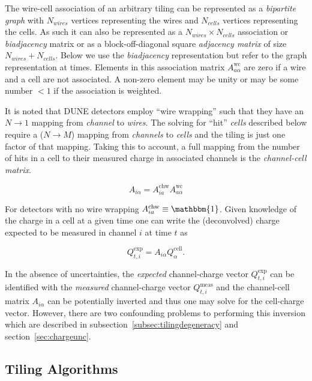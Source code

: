 \documentclass[letter]{article}
\def\mQexp{Q^{\mathrm{exp}}_{t,i}}
\def\Qexp{$\mQexp$\xspace}
\def\mQmeas{Q^{\mathrm{meas}}_{t,i}}
\def\Qmeas{$\mQmeas$\xspace}
\def\mAchc{A_{i\alpha}}
\def\Achc{$\mAchc$\xspace}
\def\mAchw{A^{\mathrm{chw}}_{ia}}
\def\mAwc{A^{\mathrm{wc}}_{a\alpha}}
\def\Awc{$\mAwc$\xspace}
\def\mQcell{Q^{\mathrm{cell}}_\alpha}
\begin{document}
The wire-cell association of an arbitrary tiling can be represented as
a \textit{bipartite graph} with $N_{wires}$ vertices representing the
wires and $N_{cells}$ vertices representing the cells.
As such it can also be represented as a $N_{wires} \times N_{cells}$
association or \textit{biadjacency} matrix or as a block-off-diagonal
square \textit{adjacency matrix} of size $N_{wires} + N_{cells}$.
Below we use the \textit{biadjacency} representation but refer to the
graph representation at times.
Elements in this association matrix \Awc are zero if a wire and a cell
are not associated.
A non-zero element may be unity or may be some number $<1$ if the
association is weighted.

It is noted that DUNE detectors employ ``wire wrapping'' such that
they have an $N \to 1$ mapping from \textit{channel} to
\textit{wires}.
The solving for ``hit'' \textit{cells} described below require a ($N
\to M$) mapping from \textit{channels} to \textit{cells} and the
tiling is just one factor of that mapping.
Taking this to account, a full mapping from the number of hits in a
cell to their measured charge in associated channels is the
\textit{channel-cell matrix}.

\begin{equation}
  \label{eq:Achc}
  \mAchc = \mAchw \mAwc
\end{equation}

For detectors with no wire wrapping $\mAchw \equiv \mathbbm{1}$.
Given knowledge of the charge in a cell at a given time one can write
the (deconvolved) charge expected to be measured in channel $i$ at
time $t$ as

\begin{equation}
  \label{eq:Qexp}
  \mQexp = \mAchc \mQcell.
\end{equation}

In the absence of uncertainties, the \textit{expected} channel-charge vector \Qexp
can be identified with the \textit{measured} channel-charge vector \Qmeas and the
channel-cell matrix \Achc can be potentially inverted and thus one may solve
for the cell-charge vector.
However, there are two confounding problems to performing this
inversion which are described in
subsection~\ref{subsec:tilingdegeneracy} and section~\ref{sec:chargeunc}.

\subsection{Tiling Algorithms}
\label{subsec:tilingalg}
\end{document}
